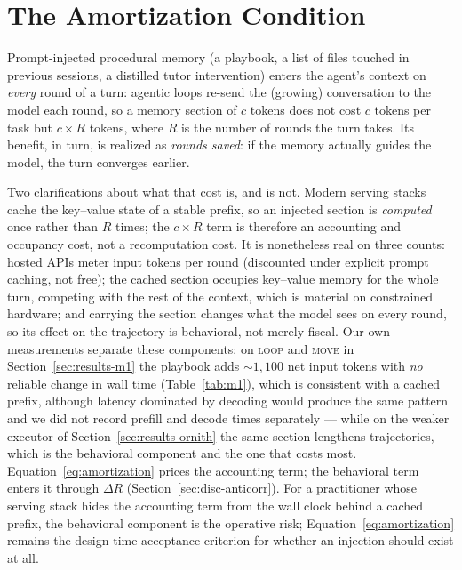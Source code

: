 \documentclass[smallcondensed,natbib]{svjour3}
\begin{document}
\section{The Amortization Condition}\label{sec:model}

Prompt-injected procedural memory (a playbook, a list of files
touched in previous sessions, a distilled tutor intervention) enters
the agent's context on \emph{every} round of a turn: agentic
loops re-send the (growing) conversation to the model each round, so a
memory section of $c$ tokens does not cost $c$ tokens per task but
$c \times R$ tokens, where $R$ is the number of rounds the turn takes.
Its benefit, in turn, is realized as \emph{rounds saved}: if the
memory actually guides the model, the turn converges earlier.

Two clarifications about what that cost is, and is not. Modern
serving stacks cache the key--value state of a stable prefix, so an
injected section is \emph{computed} once rather than $R$ times; the
$c \times R$ term is therefore an accounting and occupancy cost, not
a recomputation cost. It is nonetheless real on three counts: hosted
APIs meter input tokens per round (discounted under explicit prompt
caching, not free); the cached section occupies key--value memory for
the whole turn, competing with the rest of the context, which is
material on constrained hardware; and carrying the section changes
what the model sees on every round, so its effect on the trajectory
is behavioral, not merely fiscal. Our own measurements separate these
components: on \textsc{loop} and \textsc{move} in Section~\ref{sec:results-m1}
the playbook adds ${\sim}1{,}100$ net input tokens with \emph{no}
reliable change in wall time (Table~\ref{tab:m1}), which is
consistent with a cached prefix, although latency dominated by
decoding would produce the same pattern and we did not record prefill
and decode times separately --- while on the weaker executor of
Section~\ref{sec:results-ornith} the same section lengthens
trajectories, which is the behavioral component and the one that
costs most. Equation~\eqref{eq:amortization} prices the
accounting term; the behavioral term enters it through $\Delta R$
(Section~\ref{sec:disc-anticorr}). For a practitioner whose
serving stack hides the accounting term from the wall clock behind a
cached prefix, the behavioral component is the operative risk;
Equation~\eqref{eq:amortization} remains the design-time acceptance
criterion for whether an injection should exist at all.
\end{document}
